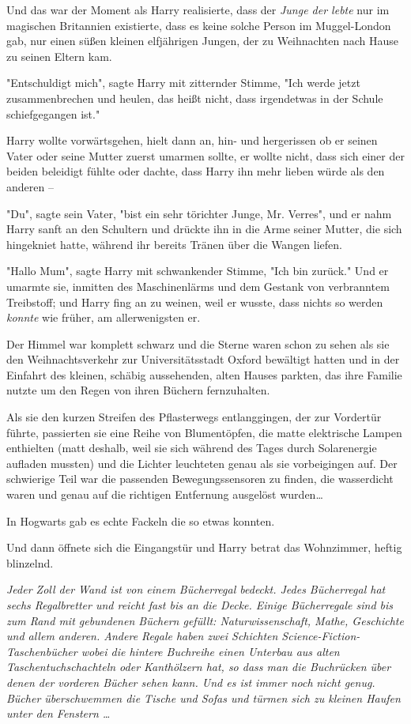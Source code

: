 {Und das war der Moment als Harry realisierte, dass der \emph{Junge der lebte} nur im magischen Britannien existierte, dass es keine solche Person im Muggel-London gab, nur einen süßen kleinen elfjährigen Jungen, der zu Weihnachten nach Hause zu seinen Eltern kam.

"Entschuldigt mich", sagte Harry mit zitternder Stimme, "Ich werde jetzt zusammenbrechen und heulen, das heißt nicht, dass irgendetwas in der Schule schiefgegangen ist."

Harry wollte vorwärtsgehen, hielt dann an, hin- und hergerissen ob er seinen Vater oder seine Mutter zuerst umarmen sollte, er wollte nicht, dass sich einer der beiden beleidigt fühlte oder dachte, dass Harry ihn mehr lieben würde als den anderen --

"Du", sagte sein Vater, "bist ein sehr törichter Junge, Mr. Verres", und er nahm Harry sanft an den Schultern und drückte ihn in die Arme seiner Mutter, die sich hingekniet hatte, während ihr bereits Tränen über die Wangen liefen.

"Hallo Mum", sagte Harry mit schwankender Stimme, "Ich bin zurück." Und er umarmte sie, inmitten des Maschinenlärms und dem Gestank von verbranntem Treibstoff; und Harry fing an zu weinen, weil er wusste, dass nichts so werden \emph{konnte} wie früher, am allerwenigsten er.

Der Himmel war komplett schwarz und die Sterne waren schon zu sehen als sie den Weihnachtsverkehr zur Universitätsstadt Oxford bewältigt hatten und in der Einfahrt des kleinen, schäbig aussehenden, alten Hauses parkten, das ihre Familie nutzte um den Regen von ihren Büchern fernzuhalten.

Als sie den kurzen Streifen des Pflasterwegs entlanggingen, der zur Vordertür führte, passierten sie eine Reihe von Blumentöpfen, die matte elektrische Lampen enthielten (matt deshalb, weil sie sich während des Tages durch Solarenergie aufladen mussten) und die Lichter leuchteten genau als sie vorbeigingen auf. Der schwierige Teil war die passenden Bewegungssensoren zu finden, die wasserdicht waren und genau auf die richtigen Entfernung ausgelöst wurden…

In Hogwarts gab es echte Fackeln die so etwas konnten.

Und dann öffnete sich die Eingangstür und Harry betrat das Wohnzimmer, heftig blinzelnd.

\emph{Jeder Zoll der Wand ist von einem Bücherregal bedeckt. Jedes Bücherregal hat sechs Regalbretter und reicht fast bis an die Decke. Einige Bücherregale sind bis zum Rand mit gebundenen Büchern gefüllt: Naturwissenschaft, Mathe, Geschichte und allem anderen. Andere Regale haben zwei Schichten Science-Fiction-Taschenbücher wobei die hintere Buchreihe einen Unterbau aus alten Taschentuchschachteln oder Kanthölzern hat, so dass man die Buchrücken über denen der vorderen Bücher sehen kann. Und es ist immer noch} \emph{nicht genug. Bücher überschwemmen die Tische und Sofas und türmen sich zu kleinen Haufen unter den Fenstern …}

}
